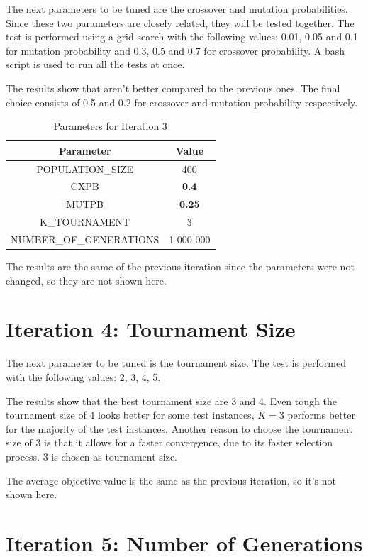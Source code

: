 The next parameters to be tuned are the crossover and mutation probabilities. Since these two parameters are closely related, they will be tested together.
The test is performed using a grid search with the following values: 0.01, 0.05 and 0.1 for mutation probability and 0.3, 0.5 and 0.7 for crossover probability.
A bash script is used to run all the tests at once.

The results show that aren't better compared to the previous ones. 
The final choice consists of 0.5 and 0.2 for crossover and mutation probability respectively.

\begin{table}[h]
    \centering
    \begin{tabular}{|c c|}
        \hline
        \textbf{Parameter} & \textbf{Value} \\
        \hline
        POPULATION\_SIZE & 400 \\
        CXPB & \textbf{0.4} \\
        MUTPB & \textbf{0.25} \\
        K\_TOURNAMENT & 3 \\
        NUMBER\_OF\_GENERATIONS & 1 000 000 \\
        \hline
    \end{tabular}
    \caption{Parameters for Iteration 3}
    \label{tab:iteration1_parameters}
\end{table}

The results are the same of the previous iteration since the parameters were not changed, so they are not shown here.

\section{Iteration 4: Tournament Size}

The next parameter to be tuned is the tournament size. The test is performed with the following values: 2, 3, 4, 5.

The results show that the best tournament size are 3 and 4.
Even tough the tournament size of 4 looks better for some test instances, $K=3$ performs better for the majority of the test instances. Another reason to choose the tournament size of 3 is that it allows for a faster convergence, due to its faster selection process.
3 is chosen as tournament size.

The average objective value is the same as the previous iteration, so it's not shown here.

\section{Iteration 5: Number of Generations}

